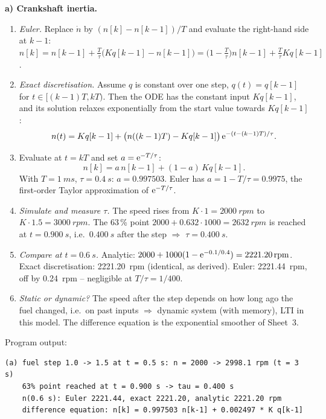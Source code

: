\begin{solution}
\textbf{a) Crankshaft inertia.}
\begin{enumerate}[label=Step \arabic*:,leftmargin=*,itemsep=1pt]
  \item \emph{Euler.} Replace $\dot n$ by $(n[k]-n[k-1])/T$ and evaluate the
    right-hand side at $k-1$:
    $n[k]=n[k-1]+\frac{T}{\tau}\bigl(Kq[k-1]-n[k-1]\bigr)
    =\bigl(1-\frac{T}{\tau}\bigr)n[k-1]+\frac{T}{\tau}Kq[k-1]$.
  \item \emph{Exact discretisation.} Assume $q$ is constant over one step,
    $q(t)=q[k-1]$ for $t\in[(k-1)T,kT)$. Then the ODE has the constant input
    $Kq[k-1]$, and its solution relaxes exponentially from the start value
    towards $Kq[k-1]$:
    \[ n(t)=Kq[k-1]+\bigl(n((k-1)T)-Kq[k-1]\bigr)\,\mathrm{e}^{-(t-(k-1)T)/\tau}. \]
  \item Evaluate at $t=kT$ and set $a=\mathrm{e}^{-T/\tau}$:
    \[ n[k]=a\,n[k-1]+(1-a)\,Kq[k-1]. \]
    With $T=\SI{1}{ms}$, $\tau=\SI{0.4}{s}$: $a=0.997503$. Euler has
    $a=1-T/\tau=0.9975$, the first-order Taylor approximation of $\mathrm{e}^{-T/\tau}$.
  \item \emph{Simulate and measure $\tau$.} The speed rises from
    $K\cdot1=\SI{2000}{rpm}$ to $K\cdot1.5=\SI{3000}{rpm}$. The 63\,\% point
    $2000+0.632\cdot1000=\SI{2632}{rpm}$ is reached at $t=\SI{0.900}{s}$, i.e.\
    $\SI{0.400}{s}$ after the step $\Rightarrow$ $\tau=\SI{0.400}{s}$.
  \item \emph{Compare at $t=\SI{0.6}{s}$.} Analytic:
    $2000+1000(1-\mathrm{e}^{-0.1/0.4})=\SI{2221.20}{rpm}$. Exact discretisation:
    \SI{2221.20}{rpm} (identical, as derived). Euler: \SI{2221.44}{rpm}, off by
    \SI{0.24}{rpm} -- negligible at $T/\tau=1/400$.
  \item \emph{Static or dynamic?} The speed after the step depends on how long
    ago the fuel changed, i.e.\ on past inputs $\Rightarrow$ dynamic system
    (with memory), LTI in this model. The difference equation is the
    exponential smoother of Sheet~3.
\end{enumerate}
Program output:
\begin{lstlisting}[style=shell,numbers=none]
(a) fuel step 1.0 -> 1.5 at t = 0.5 s: n = 2000 -> 2998.1 rpm (t = 3 s)
    63% point reached at t = 0.900 s -> tau = 0.400 s
    n(0.6 s): Euler 2221.44, exact 2221.20, analytic 2221.20 rpm
    difference equation: n[k] = 0.997503 n[k-1] + 0.002497 * K q[k-1]
\end{lstlisting}


\end{solution}
